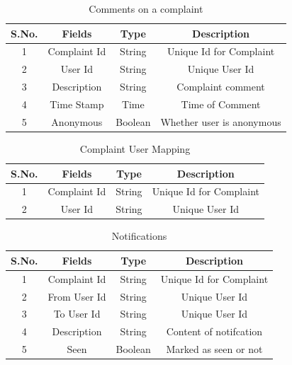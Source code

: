 \documentclass{article}
\begin{document}
\begin{table}[]
\centering
\caption{Comments on a complaint}
\label{my-label}
\begin{tabular}{|c|c|c|c|}
\hline
\textbf{S.No.} & \textbf{Fields} & \textbf{Type} & \textbf{Description}    \\ \hline
1              & Complaint Id    & String        & Unique Id for Complaint \\ \hline
2              & User Id         & String        & Unique User Id          \\ \hline
3              & Description     & String        & Complaint comment       \\ \hline
4              & Time Stamp      & Time          & Time of Comment         \\ \hline
5              & Anonymous      & Boolean          & Whether user is anonymous         \\ \hline
\end{tabular}
\end{table}


\begin{table}[]
\centering
\caption{Complaint User Mapping}
\label{my-label}
\begin{tabular}{|c|c|c|c|}
\hline
\textbf{S.No.} & \textbf{Fields} & \textbf{Type} & \textbf{Description}    \\ \hline
1              & Complaint Id    & String        & Unique Id for Complaint \\ \hline
2              & User Id         & String        & Unique User Id          \\ \hline
\end{tabular}
\end{table}



\begin{table}[]
\centering
\caption{Notifications}
\label{my-label}
\begin{tabular}{|c|c|c|c|}
\hline
\textbf{S.No.} & \textbf{Fields} & \textbf{Type} & \textbf{Description}    \\ \hline
1              & Complaint Id    & String        & Unique Id for Complaint \\ \hline
2              & From User Id    & String        & Unique User Id          \\ \hline
3              & To User Id      & String        & Unique User Id          \\ \hline
4              & Description     & String        & Content of notifcation  \\ \hline
5              & Seen            & Boolean       & Marked as seen or not   \\ \hline
\end{tabular}
\end{table}
\end{document}
